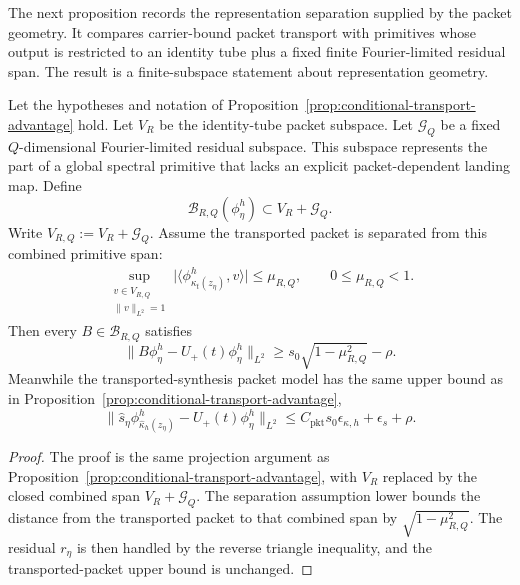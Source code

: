 The next proposition records the representation separation supplied by the packet geometry.  It compares carrier-bound packet transport with primitives whose output is restricted to an identity tube plus a fixed finite Fourier-limited residual span.  The result is a finite-subspace statement about representation geometry.

\begin{proposition}
\label{prop:primitive-level-separation}
Let the hypotheses and notation of Proposition~\ref{prop:conditional-transport-advantage} hold.  Let $V_R$ be the identity-tube packet subspace.  Let $\mathcal G_Q$ be a fixed $Q$-dimensional Fourier-limited residual subspace.  This subspace represents the part of a global spectral primitive that lacks an explicit packet-dependent landing map.  Define
\[
\mathcal B_{R,Q}(\phi_\eta^h)
\subset
V_R+\mathcal G_Q .
\]
Write $V_{R,Q}:=V_R+\mathcal G_Q$.  Assume the transported packet is separated from this combined primitive span:
\begin{align*}
\sup_{\substack{v\in V_{R,Q}\\ \|v\|_{L^2}=1}}
\bigl|\langle \phi_{\kappa_t(z_\eta)}^h,v\rangle\bigr|
\le \mu_{R,Q},
\qquad
0\le \mu_{R,Q}<1 .
\end{align*}
Then every $B\in\mathcal B_{R,Q}$ satisfies
\[
\|B\phi_\eta^h-U_+(t)\phi_\eta^h\|_{L^2}
\ge
s_0\sqrt{1-\mu_{R,Q}^2}-\rho .
\]
Meanwhile the transported-synthesis packet model has the same upper bound as in Proposition~\ref{prop:conditional-transport-advantage},
\[
\|\hat s_\eta \phi_{\hat\kappa_h(z_\eta)}^h-U_+(t)\phi_\eta^h\|_{L^2}
\le
C_{\mathrm{pkt}}s_0\epsilon_{\kappa,h}
+
\epsilon_s
+
\rho .
\]
\end{proposition}

\begin{proof}
The proof is the same projection argument as Proposition~\ref{prop:conditional-transport-advantage}, with $V_R$ replaced by the closed combined span $V_R+\mathcal G_Q$.  The separation assumption lower bounds the distance from the transported packet to that combined span by $\sqrt{1-\mu_{R,Q}^2}$.  The residual $r_\eta$ is then handled by the reverse triangle inequality, and the transported-packet upper bound is unchanged.
\end{proof}

